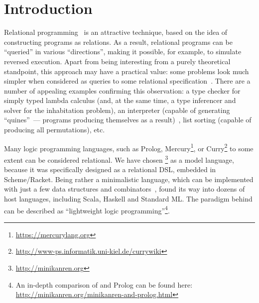 \section{Introduction}
\label{intro}

Relational programming~\cite{TRS} is an attractive technique, based on the idea
of constructing programs as relations.  As a result, relational programs can be
``queried'' in various ``directions'', making it possible, for example, to simulate
reversed execution. Apart from being interesting from a purely theoretical standpoint,
this approach may have a practical value: some problems look much simpler
when considered as queries to some relational specification~\cite{WillThesis}. There are a
number of appealing examples confirming this observation: a type checker
for simply typed lambda calculus (and, at the same time, a type inferencer and solver
for the inhabitation problem), an interpreter (capable of generating ``quines''~---
programs producing themselves as a result)~\cite{Untagged}, list sorting (capable of
producing all permutations), etc.

Many logic programming languages, such as Prolog, Mercury\footnote{\url{https://mercurylang.org}},
or Curry\footnote{\url{http://www-ps.informatik.uni-kiel.de/currywiki}} to some extent
can be considered relational. We have chosen \miniKanren\footnote{\url{http://minikanren.org}}
as a model language, because it was specifically designed as a relational DSL, embedded in Scheme/Racket.
Being rather a minimalistic language, which can be implemented with just a few data structures and
combinators~\cite{MicroKanren, MuKanrenNew}, \miniKanren found its way into dozens of host languages, including Scala, Haskell and Standard ML.
The paradigm behind \miniKanren can be described as ``lightweight logic programming''\footnote{An in-depth comparison of \miniKanren
and Prolog can be found here: \url{http://minikanren.org/minikanren-and-prolog.html}}.


